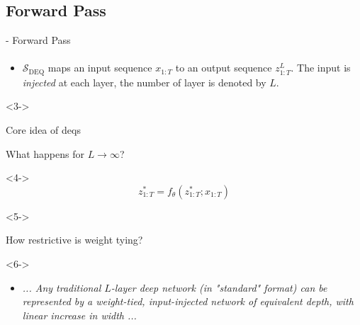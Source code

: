 \documentclass[8pt, t,
aspectratio=169,%
]{beamer}
\begin{document}
\subsection{Forward Pass}
\begin{frame}{ - Forward Pass}
    \framesubtitle{\cite{bai2019deep}}

    \begin{itemize}
        \item $\mathcal{S}_{\operatorname{DEQ}}$ maps an input sequence $x_{1:T}$ to an output sequence $z_{1:T}^L$. The input is \emph{injected} at each layer, the number of layer is denoted by $L$.
    \end{itemize}

    \begin{figure}
        
    \end{figure}

    \begin{onlyenv}<3->
        \begin{block}{Core idea of \glspl{deq}}
            \begin{itemize}
                \item What happens for $L\to\infty$?
                \begin{onlyenv}<4->
                    $$z_{1:T}^* = f_{\theta}(z_{1:T}^*;x_{1:T})$$
                \end{onlyenv}
                \begin{onlyenv}<5->
                \item How restrictive is weight tying?
                \begin{onlyenv}<6->
                    \begin{itemize}
                        \item \emph{... Any traditional $L$-layer deep network (in "standard" format) can be represented by a weight-tied, input-injected network of equivalent depth, with linear increase in width ...}
                    \end{itemize}    
                \end{onlyenv}
                

\end{onlyenv}
\end{itemize}
\end{block}
\end{onlyenv}
\end{frame}
\end{document}
